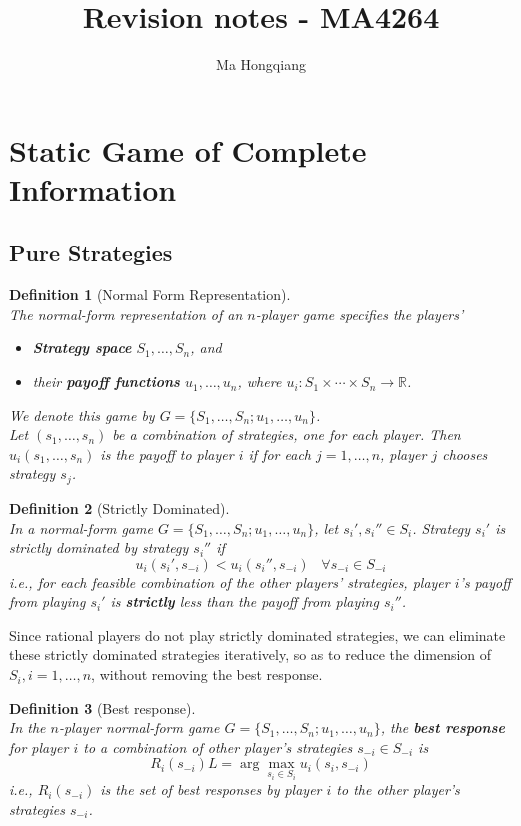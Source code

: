 \documentclass[12pt]{article}
\newtheorem{definition}{Definition}[section]
\theoremstyle{definition}
\begin{document}
\title{Revision notes - MA4264}
\author{Ma Hongqiang}
\maketitle
\tableofcontents

\clearpage
\section{Static Game of Complete Information}
\subsection{Pure Strategies}
\begin{definition}[Normal Form Representation]
\hfill\\\normalfont
The normal-form representation of an $n$-player game specifies the players'
\begin{itemize}
  \item \textbf{Strategy space} $S_1,\ldots, S_n$, and 
  \item their \textbf{payoff functions} $u_1, \ldots, u_n$, where $u_i: S_1\times \cdots\times S_n \to \mathbb{R}$.
\end{itemize}
We denote this game by $G=\{S_1,\ldots, S_n; u_1,\ldots, u_n\}$.\\
Let $(s_1,\ldots, s_n)$ be a combination of strategies, one for each player. Then $u_i(s_1,\ldots, s_n)$ is the payoff to player $i$ if for each $j=1,\ldots, n$, player $j$ chooses strategy $s_j$.
\end{definition}
\begin{definition}[Strictly Dominated]
\hfill\\\normalfont In a normal-form game $G=\{S_1,\ldots, S_n; u_1,\ldots, u_n\}$, let $s_i', s_i''\in S_i$. Strategy $s_i'$ is strictly dominated by strategy $s_i''$ if 
\[
u_i(s_i', s_{-i})<u_i(s_i'', s_{-i})\;\;\;\forall s_{-i}\in S_{-i}
\]
i.e., for each feasible combination of the other players' strategies, player $i$'s payoff from playing $s_i'$ is \textbf{strictly} less than the payoff from playing $s_i''$.
\end{definition}
Since rational players do not play strictly dominated strategies, we can eliminate these strictly dominated strategies iteratively, so as to reduce the dimension of $S_i, i=1,\ldots, n$, without removing the best response.
\begin{definition}[Best response]
\hfill\\\normalfont In the $n$-player normal-form game $G=\{S_1,\ldots, S_n; u_1,\ldots, u_n\}$, the \textbf{best response} for player $i$ to a combination of other player's strategies $s_{-i}\in S_{-i}$ is
\[
R_i(s_{-i})L=\arg\max_{s_i\in S_i}u_i(s_i, s_{-i})
\]
i.e., $R_i(s_{-i})$ is the \textit{set of best responses} by player $i$ to the other player's strategies $s_{-i}$.
\end{definition}
\end{document}
